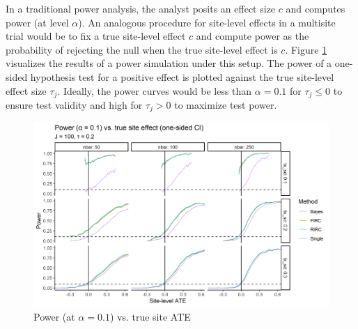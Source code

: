 \documentclass[]{article}
\begin{document}




In a traditional power analysis, the analyst posits an effect size $c$ and computes power (at level $\alpha$).
An analogous procedure for site-level effects in a multisite trial would be to fix a true site-level effect $c$ and compute power as the probability of rejecting the null when the true site-level effect is $c$.
Figure \ref{fig:power_plot} visualizes the results of a power simulation under this setup.
The power of a one-sided hypothesis test for a positive effect is plotted against the true site-level effect size $\tau_j$.
Ideally, the power curves would be less than $\alpha = 0.1$ for $\tau_j \leq 0$ to ensure test validity and high for $\tau_j > 0$ to maximize test power.
\begin{figure}[ht]
	\centering
	\includegraphics[width=\textwidth]{power_plot_J100}
	\caption{Power (at $\alpha = 0.1$) vs. true site ATE}
	\label{fig:power_plot}
\end{figure}
\end{document}
